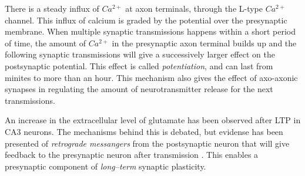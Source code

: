 There is a steady influx of $Ca^{2+}$ at axon terminals, through the L-type $Ca^{2+}$ channel. %
This influx of calcium is graded by the potential over the presynaptic membrane.
When multiple synaptic transmissions happens within a short period of time, 
	the amount of $Ca^{2+}$ in the presynaptic axon terminal builds up and the following synaptic transmissions will give a successively larger effect on the postsynaptic potential.
This effect is called \emph{potentiation}, and can last from minites to more than an hour.
This mechanism also gives the effect of axo-axonic synapses in regulating the amount of neurotransmitter release for the next transmissions\cite{PrinciplesOfNeuralScience4edKAP14}.



An increase in the extracellular level of glutamate has been observed after LTP in CA3 neurons. 
The mechanisms behind this is debated, but evidense has been presented of \emph{retrograde messangers} from the postsynaptic neuron that will 
	give feedback to the presynaptic neuron after transmission \cite{PrinciplesOfNeuralScience4edKAP63}. 
This enables a  presynaptic component of \emph{long--term} synaptic plasticity.








